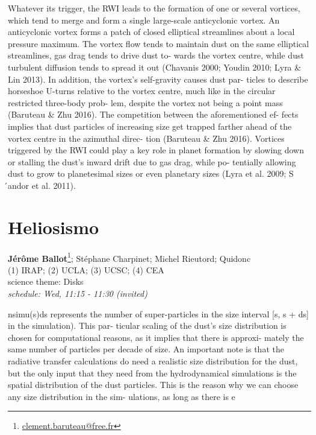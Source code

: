\documentclass[11pt,twoside, openright]{report}
\begin{document}
      Whatever its trigger, the RWI leads to the formation of one or several vortices, which tend to merge and form a single large-scale anticyclonic vortex. An anticyclonic vortex forms a patch of closed elliptical streamlines about a local pressure maximum. The vortex flow tends to maintain dust on the same elliptical streamlines, gas drag tends to drive dust to- wards the vortex centre, while dust turbulent diffusion tends to spread it out (Chavanis 2000; Youdin 2010; Lyra \& Lin 2013). In addition, the vortex’s self-gravity causes dust par- ticles to describe horseshoe U-turns relative to the vortex centre, much like in the circular restricted three-body prob- lem, despite the vortex not being a point mass (Baruteau \& Zhu 2016). The competition between the aforementioned ef- fects implies that dust particles of increasing size get trapped farther ahead of the vortex centre in the azimuthal direc- tion (Baruteau \& Zhu 2016). Vortices triggered by the RWI could play a key role in planet formation by slowing down or stalling the dust’s inward drift due to gas drag, while po- tentially allowing dust to grow to planetesimal sizes or even planetary sizes (Lyra et al. 2009; S ́andor et al. 2011). 

        
          \section[Jérôme Ballot: Heliosismo] { Heliosismo }
\textbf{ Jérôme Ballot}\footnote{\href{mailto: clement.baruteau@free.fr}{clement.baruteau@free.fr} };  Stéphane Charpinet;  Michel Rieutord;  Quidonc\\
    (1) IRAP; (2)  UCLA; (3)  UCSC; (4)  CEA\\


    
    \noindent
    science theme: Disks\\
    \emph{schedule: Wed, 11:15 - 11:30  (invited)  }\\


 
    
\vspace{3 mm}

      nsimu(s)ds represents the number of super-particles in the size interval [s, s + ds] in the simulation). This par- ticular scaling of the dust’s size distribution is chosen for computational reasons, as it implies that there is approxi- mately the same number of particles per decade of size. An important note is that the radiative transfer calculations do need a realistic size distribution for the dust, but the only input that they need from the hydrodynamical simulations is the spatial distribution of the dust particles. This is the reason why we can choose any size distribution in the sim- ulations, as long as there is e 
\end{document}
